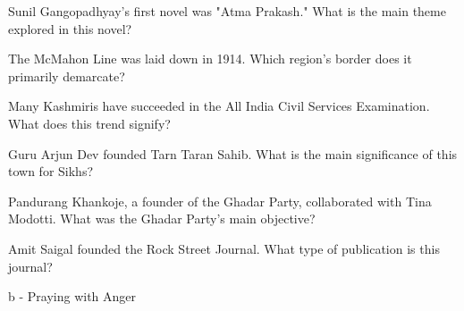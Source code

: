 \documentclass[12pt,a4paper]{book}
\begin{document}
\begin{enhancedmcq}[Question 45]{Sunil Gangopadhyay's first novel was "Atma Prakash." What is the main theme explored in this novel?}
\end{enhancedmcq}

\begin{enhancedmcq}[Question 46]{The McMahon Line was laid down in 1914. Which region's border does it primarily demarcate?}
\end{enhancedmcq}

\begin{enhancedmcq}[Question 47]{Many Kashmiris have succeeded in the All India Civil Services Examination. What does this trend signify?}
\end{enhancedmcq}

\begin{enhancedmcq}[Question 48]{Guru Arjun Dev founded Tarn Taran Sahib. What is the main significance of this town for Sikhs?}
\end{enhancedmcq}

\begin{enhancedmcq}[Question 49]{Pandurang Khankoje, a founder of the Ghadar Party, collaborated with Tina Modotti. What was the Ghadar Party's main objective?}
\end{enhancedmcq}

\begin{enhancedmcq}[Question 50]{Amit Saigal founded the Rock Street Journal. What type of publication is this journal?}
\end{enhancedmcq}

\begin{enhancedmcq}[Question 1]{b - Praying with Anger}
\end{enhancedmcq}
\end{document}
